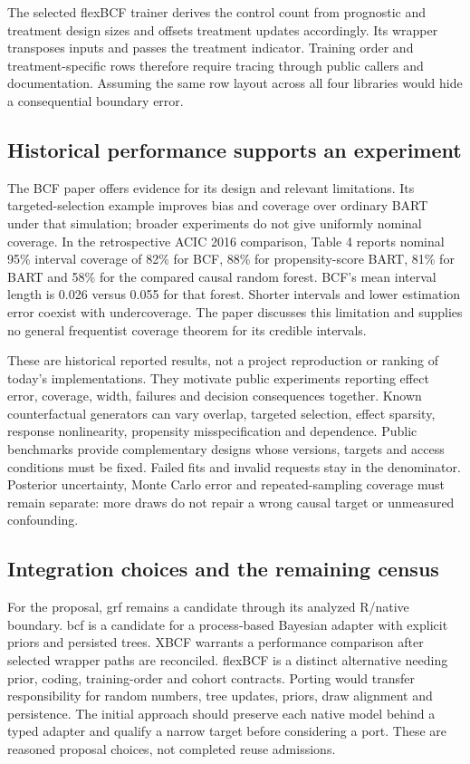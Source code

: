 The selected flexBCF trainer derives the control count from prognostic and treatment design sizes and offsets treatment updates accordingly. Its wrapper transposes inputs and passes the treatment indicator. Training order and treatment-specific rows therefore require tracing through public callers and documentation. Assuming the same row layout across all four libraries would hide a consequential boundary error.~\citep{exec21_cxx_flexbcf}

\subsection{Historical performance supports an experiment}
\label{exec21:cxx-evidence}
The BCF paper offers evidence for its design and relevant limitations. Its targeted-selection example improves bias and coverage over ordinary BART under that simulation; broader experiments do not give uniformly nominal coverage. In the retrospective ACIC 2016 comparison, Table 4 reports nominal 95\% interval coverage of 82\% for BCF, 88\% for propensity-score BART, 81\% for BART and 58\% for the compared causal random forest. BCF's mean interval length is 0.026 versus 0.055 for that forest. Shorter intervals and lower estimation error coexist with undercoverage. The paper discusses this limitation and supplies no general frequentist coverage theorem for its credible intervals.~\citep{exec21_cxx_hahn}

These are historical reported results, not a project reproduction or ranking of today's implementations. They motivate public experiments reporting effect error, coverage, width, failures and decision consequences together. Known counterfactual generators can vary overlap, targeted selection, effect sparsity, response nonlinearity, propensity misspecification and dependence. Public benchmarks provide complementary designs whose versions, targets and access conditions must be fixed. Failed fits and invalid requests stay in the denominator. Posterior uncertainty, Monte Carlo error and repeated-sampling coverage must remain separate: more draws do not repair a wrong causal target or unmeasured confounding.~\citep{exec21_cxx_hahn,exec21_cxx_reference}

\subsection{Integration choices and the remaining census}
\label{exec21:cxx-integration}
For the proposal, grf remains a candidate through its analyzed R/native boundary. bcf is a candidate for a process-based Bayesian adapter with explicit priors and persisted trees. XBCF warrants a performance comparison after selected wrapper paths are reconciled. flexBCF is a distinct alternative needing prior, coding, training-order and cohort contracts. Porting would transfer responsibility for random numbers, tree updates, priors, draw alignment and persistence. The initial approach should preserve each native model behind a typed adapter and qualify a narrow target before considering a port. These are reasoned proposal choices, not completed reuse admissions.~\citep{exec21_cxx_grf,exec21_cxx_bcf,exec21_cxx_xbcf,exec21_cxx_flexbcf}


